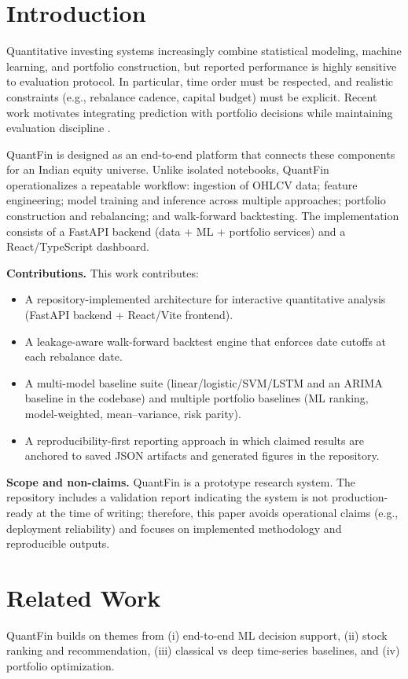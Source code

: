 \documentclass{svproc}
\begin{document}
\section{Introduction}\label{sec:intro}
Quantitative investing systems increasingly combine statistical modeling, machine learning, and portfolio construction, but reported performance is highly sensitive to evaluation protocol. In particular, time order must be respected, and realistic constraints (e.g., rebalance cadence, capital budget) must be explicit. Recent work motivates integrating prediction with portfolio decisions while maintaining evaluation discipline \citep{aithal2023realtime, gunjan2022portfolioreview}.

QuantFin is designed as an end-to-end platform that connects these components for an Indian equity universe. Unlike isolated notebooks, QuantFin operationalizes a repeatable workflow: ingestion of OHLCV data; feature engineering; model training and inference across multiple approaches; portfolio construction and rebalancing; and walk-forward backtesting. The implementation consists of a FastAPI backend (data + ML + portfolio services) and a React/TypeScript dashboard.

\textbf{Contributions.} This work contributes:
\begin{itemize}
\item A repository-implemented architecture for interactive quantitative analysis (FastAPI backend + React/Vite frontend).
\item A leakage-aware walk-forward backtest engine that enforces date cutoffs at each rebalance date.
\item A multi-model baseline suite (linear/logistic/SVM/LSTM and an ARIMA baseline in the codebase) and multiple portfolio baselines (ML ranking, model-weighted, mean--variance, risk parity).
\item A reproducibility-first reporting approach in which claimed results are anchored to saved JSON artifacts and generated figures in the repository.
\end{itemize}

\textbf{Scope and non-claims.} QuantFin is a prototype research system. The repository includes a validation report indicating the system is not production-ready at the time of writing; therefore, this paper avoids operational claims (e.g., deployment reliability) and focuses on implemented methodology and reproducible outputs.

\section{Related Work}\label{sec:rw}
QuantFin builds on themes from (i) end-to-end ML decision support, (ii) stock ranking and recommendation, (iii) classical vs deep time-series baselines, and (iv) portfolio optimization.
\end{document}
